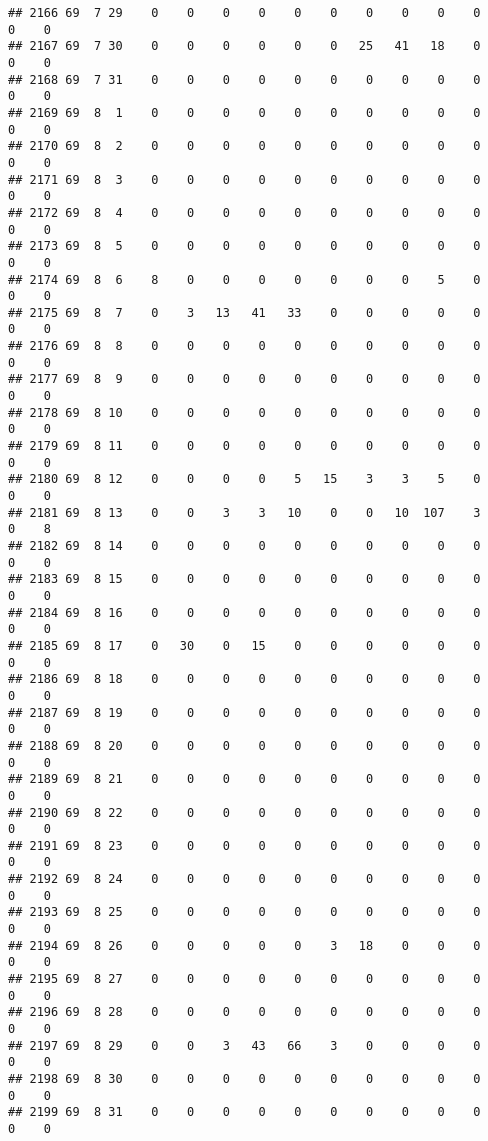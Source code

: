 \documentclass[]{article}
\begin{document}
\begin{verbatim}
## 2166 69  7 29    0    0    0    0    0    0    0    0    0    0    0    0
## 2167 69  7 30    0    0    0    0    0    0   25   41   18    0    0    0
## 2168 69  7 31    0    0    0    0    0    0    0    0    0    0    0    0
## 2169 69  8  1    0    0    0    0    0    0    0    0    0    0    0    0
## 2170 69  8  2    0    0    0    0    0    0    0    0    0    0    0    0
## 2171 69  8  3    0    0    0    0    0    0    0    0    0    0    0    0
## 2172 69  8  4    0    0    0    0    0    0    0    0    0    0    0    0
## 2173 69  8  5    0    0    0    0    0    0    0    0    0    0    0    0
## 2174 69  8  6    8    0    0    0    0    0    0    0    5    0    0    0
## 2175 69  8  7    0    3   13   41   33    0    0    0    0    0    0    0
## 2176 69  8  8    0    0    0    0    0    0    0    0    0    0    0    0
## 2177 69  8  9    0    0    0    0    0    0    0    0    0    0    0    0
## 2178 69  8 10    0    0    0    0    0    0    0    0    0    0    0    0
## 2179 69  8 11    0    0    0    0    0    0    0    0    0    0    0    0
## 2180 69  8 12    0    0    0    0    5   15    3    3    5    0    0    0
## 2181 69  8 13    0    0    3    3   10    0    0   10  107    3    0    8
## 2182 69  8 14    0    0    0    0    0    0    0    0    0    0    0    0
## 2183 69  8 15    0    0    0    0    0    0    0    0    0    0    0    0
## 2184 69  8 16    0    0    0    0    0    0    0    0    0    0    0    0
## 2185 69  8 17    0   30    0   15    0    0    0    0    0    0    0    0
## 2186 69  8 18    0    0    0    0    0    0    0    0    0    0    0    0
## 2187 69  8 19    0    0    0    0    0    0    0    0    0    0    0    0
## 2188 69  8 20    0    0    0    0    0    0    0    0    0    0    0    0
## 2189 69  8 21    0    0    0    0    0    0    0    0    0    0    0    0
## 2190 69  8 22    0    0    0    0    0    0    0    0    0    0    0    0
## 2191 69  8 23    0    0    0    0    0    0    0    0    0    0    0    0
## 2192 69  8 24    0    0    0    0    0    0    0    0    0    0    0    0
## 2193 69  8 25    0    0    0    0    0    0    0    0    0    0    0    0
## 2194 69  8 26    0    0    0    0    0    3   18    0    0    0    0    0
## 2195 69  8 27    0    0    0    0    0    0    0    0    0    0    0    0
## 2196 69  8 28    0    0    0    0    0    0    0    0    0    0    0    0
## 2197 69  8 29    0    0    3   43   66    3    0    0    0    0    0    0
## 2198 69  8 30    0    0    0    0    0    0    0    0    0    0    0    0
## 2199 69  8 31    0    0    0    0    0    0    0    0    0    0    0    0

\end{verbatim}
\end{document}
